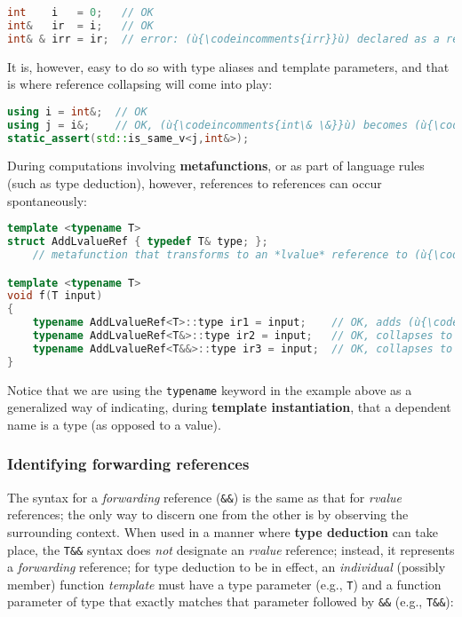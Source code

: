 \begin{lstlisting}[language=C++]
int    i   = 0;   // OK
int&   ir  = i;   // OK
int& & irr = ir;  // error: (ù{\codeincomments{irr}}ù) declared as a reference to a reference
\end{lstlisting}
    
\noindent It is, however, easy to do so with type aliases and template parameters,
and that is where reference collapsing will come into play:

\begin{lstlisting}[language=C++]
using i = int&;  // OK
using j = i&;    // OK, (ù{\codeincomments{int\& \&}}ù) becomes (ù{\codeincomments{int\&}}ù).
static_assert(std::is_same_v<j,int&>);
\end{lstlisting}
    
\noindent During computations involving \textbf{metafunctions}, or as part of
language rules (such as type deduction), however, references to
references can occur spontaneously:

\begin{lstlisting}[language=C++]
template <typename T>
struct AddLvalueRef { typedef T& type; };
    // metafunction that transforms to an *lvalue* reference to (ù{\codeincomments{T}}ù)

template <typename T>
void f(T input)
{
    typename AddLvalueRef<T>::type ir1 = input;    // OK, adds (ù{\codeincomments{\&}}ù) to make (ù{\codeincomments{T\&}}ù)
    typename AddLvalueRef<T&>::type ir2 = input;   // OK, collapses to (ù{\codeincomments{T\&}}ù)
    typename AddLvalueRef<T&&>::type ir3 = input;  // OK, collapses to (ù{\codeincomments{T\&}}ù)
}
\end{lstlisting}
    
\noindent Notice that we are using the \texttt{typename} keyword in the example above as a
generalized way of indicating, during \textbf{template instantiation},
that a dependent name is a type (as opposed to a value).

\subsubsection[Identifying forwarding references]{Identifying forwarding references}\label{identifying-forwarding-references}

The syntax for a \emph{forwarding} reference (\texttt{\&\&}) is the same
as that for \emph{rvalue} references; the only way to discern one from
the other is by observing the surrounding context. When used in a manner
where \textbf{type deduction} can take place, the \texttt{T\&\&} syntax
does \emph{not} designate an \emph{rvalue} reference; instead, it
represents a \emph{forwarding} reference; for type deduction to be in
effect, an \emph{individual} (possibly member) function \emph{template}
must have a type parameter (e.g., \texttt{T}) and a function parameter of
type that exactly matches that parameter followed by \texttt{\&\&}
(e.g., \texttt{T\&\&}):


